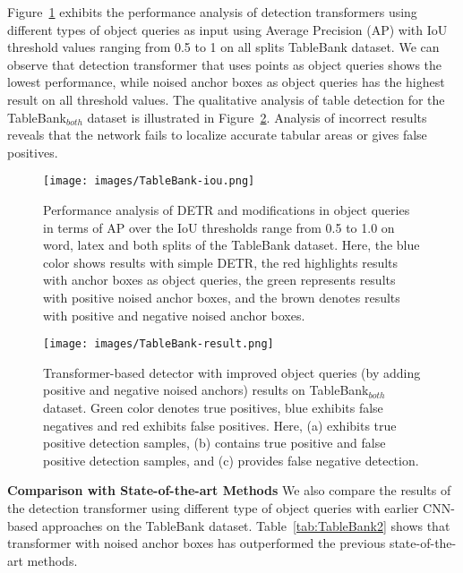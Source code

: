 \documentclass[sn-mathphys]{sn-jnl}\jyear{2021}\theoremstyle{thmstyleone}\newtheorem{theorem}{Theorem}\newtheorem{proposition}[theorem]{Proposition}\theoremstyle{thmstyletwo}\newtheorem{example}{Example}\newtheorem{remark}{Remark}\theoremstyle{thmstylethree}\newtheorem{definition}{Definition}\usepackage{amsmath}
\begin{document}
Figure~\ref{fig:TableBank-iou} exhibits the performance analysis of detection transformers using different types of object queries as input using Average Precision (AP) with IoU threshold values ranging from 0.5 to 1 on all splits TableBank dataset. We can observe that detection transformer that uses points as object queries shows the lowest performance, while noised anchor boxes as object queries has the highest result on all threshold values. The qualitative analysis of table detection for the TableBank$_{both}$ dataset is illustrated in Figure~\ref{fig:TableBank-result}. Analysis of incorrect results reveals that the network fails to localize accurate tabular areas or gives false positives.\\
\begin{figure}[h!]
\centering
\texttt{[image: images/TableBank-iou.png]}
\caption{Performance analysis of DETR and modifications in object queries in terms of AP over the IoU thresholds range from 0.5 to 1.0 on word, latex and both splits of the TableBank dataset. Here, the blue color shows results with simple DETR, the red highlights results with anchor boxes as object queries, the green represents results with positive noised anchor boxes, and the brown denotes results with positive and negative noised anchor boxes.}\label{fig:TableBank-iou}
\end{figure}

\begin{figure}[h!]
\centering
\texttt{[image: images/TableBank-result.png]}
\caption{Transformer-based detector with improved object queries (by adding positive and negative noised anchors) results on TableBank$_{both}$ dataset. Green color denotes true positives, blue exhibits false negatives and red exhibits false positives. Here, (a) exhibits true positive detection samples, (b) contains true positive and false positive detection samples, and (c) provides false negative detection.}\label{fig:TableBank-result}
\end{figure}




\noindent\textbf{Comparison with State-of-the-art Methods}
We also compare the results of the detection transformer using different type of object queries with earlier CNN-based approaches on the TableBank dataset. Table~\ref{tab:TableBank2} shows that transformer with noised anchor boxes has outperformed the previous state-of-the-art methods.  \par
\end{document}
